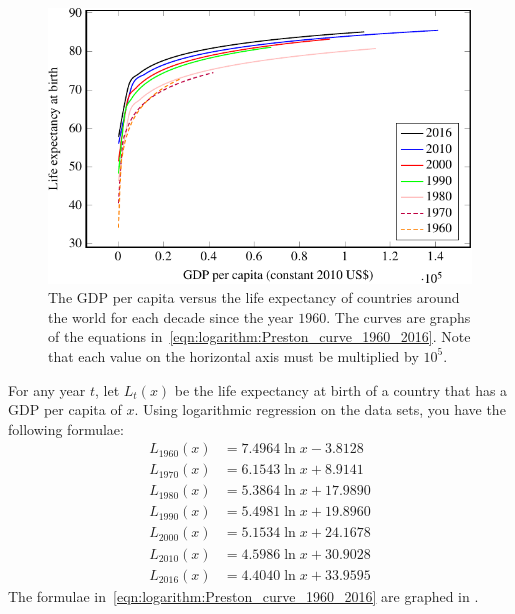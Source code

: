 \documentclass[a4paper,oneside,12pt]{article}
\begin{document}
\begin{problem}
{\begin{solution}
\begin{figure}[!htbp]
\centering
\includegraphics[scale=1.1]{image/12/preston-curve.pdf}
\caption{%
  The GDP per capita versus the life expectancy of countries around
  the world for each decade since the year $1960$.  The curves are
  graphs of the equations
  in~\eqref{eqn:logarithm:Preston_curve_1960_2016}.  Note that each
  value on the horizontal axis must be multiplied by $10^5$.
}
\label{fig:logarithm:Preston_curve_1960_2016}
\end{figure}

For any year $t$, let $L_t(x)$ be the life expectancy at birth of a
country that has a GDP per capita of $x$.  Using logarithmic
regression on the data sets, you have the following formulae:
\begin{equation}
\label{eqn:logarithm:Preston_curve_1960_2016}
\begin{aligned}
L_{1960}(x)
&=
7.4964 \ln x - 3.8128 \\[4pt]
L_{1970}(x)
&=
6.1543 \ln x + 8.9141 \\[4pt]
L_{1980}(x)
&=
5.3864 \ln x + 17.9890 \\[4pt]
L_{1990}(x)
&=
5.4981 \ln x + 19.8960 \\[4pt]
L_{2000}(x)
&=
5.1534 \ln x + 24.1678 \\[4pt]
L_{2010}(x)
&=
4.5986 \ln x + 30.9028 \\[4pt]
L_{2016}(x)
&=
4.4040 \ln x + 33.9595
\end{aligned}
\end{equation}
The formulae in~\eqref{eqn:logarithm:Preston_curve_1960_2016} are
graphed in .


\end{solution}}
\end{problem}
\end{document}
